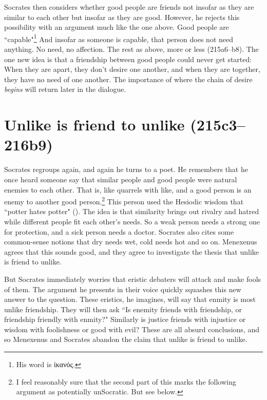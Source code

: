 \documentclass[11pt]{article}
\begin{document}
Socrates then considers whether good people are friends not insofar as they
are similar to each other but insofar as they are good.  However, he
rejects this possibility with an argument much like the one above.  Good
people are ``capable"\footnote{His word is {\g ἱκανός}.}  And insofar as
someone is capable, that person does not need anything.  No need, no
affection.  The rest as above, more or less (215a6--b8).  The one new idea
is that a friendship between good people could never get started: When they
are apart, they don't desire one another, and when they are together, they
have no need of one another.  The importance of where the chain of desire
\emph{begins} will return later in the dialogue.


\section{Unlike is friend to unlike (215c3--216b9)}

Socrates regroups again, and again he turns to a poet.  He remembers that
he once heard someone say that similar people and good people were natural
enemies to each other.  That is, like quarrels with like, and a good person
is an enemy to another good person.\footnote{I feel reasonably sure that
the second part of this marks the following argument as potentially
unSocratic.  But see below.} This person used the Hesiodic wisdom that
``potter hates potter" ().  The idea is that
similarity brings out rivalry and hatred while different people fit each
other's needs.  So a weak person needs a strong one for protection, and
a sick person needs a doctor.  Socrates also cites some common-sense
notions that dry needs wet, cold needs hot and so on.  Menexenus agrees
that this sounds good, and they agree to investigate the thesis that unlike
is friend to unlike.

But Socrates immediately worries that eristic debaters will attack and make
fools of them.  The argument he presents in their voice quickly squashes
this new answer to the question.  These eristics, he imagines, will say
that enmity is most unlike friendship.  They will then ask ``Is enemity
friends with friendship, or friendship friendly with enmity?"  Similarly is
justice friends with injustice or wisdom with foolishness or good with
evil?  These are all absurd conclusions, and so Menexenus and Socrates
abandon the claim that unlike is friend to unlike.
\end{document}
